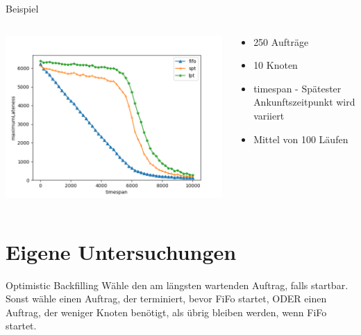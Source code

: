 \documentclass[aspectratio=169,10pt]{beamer}
\begin{document}
\begin{frame}[fragile]{Beispiel}

\begin{columns}
	\begin{column}{0.57\paperwidth}
		\vspace{0.5pt}
		\includegraphics[width=\linewidth, clip]{images/Figure_2_2}
	\end{column}
	\begin{column}[c]{0.43\paperwidth}
		\begin{itemize}
			\item 250 Auftr\"age
			\item 10 Knoten
			\item timespan - Sp\"atester Ankunftszeitpunkt wird variiert
			\item Mittel von 100 L\"aufen
		\end{itemize}
	\end{column}
\end{columns}
\end{frame}

\section{Eigene Untersuchungen}

\begin{frame}[t,fragile]{Optimistic Backfilling}
	W\"ahle den am l\"angsten wartenden Auftrag, falls startbar. Sonst w\"ahle einen Auftrag, der terminiert, bevor FiFo startet, ODER einen Auftrag, der weniger Knoten ben\"otigt, als \"ubrig bleiben werden, wenn FiFo startet.
\end{frame}
\end{document}
